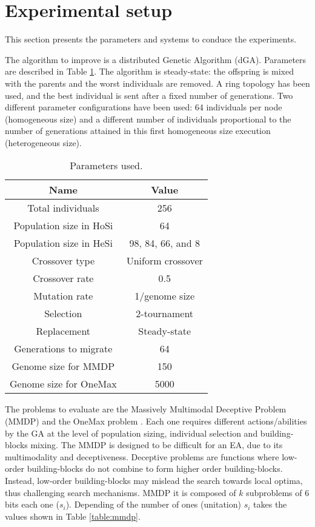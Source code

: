 \documentclass{sig-alternate}
\begin{document}

\section{Experimental setup}
\label{subsec:experiments}
This section presents the parameters and systems to conduce the experiments.

The algorithm to improve is a distributed Genetic Algorithm (dGA). Parameters are described in Table \ref{table:parameters}. The algorithm is steady-state: the offspring is mixed with the parents and the worst individuals are removed. A ring topology has been used, and the best individual is sent after a fixed number of generations.  Two different parameter configurations have been used: 64 individuals per node (homogeneous size) and a different number of individuals proportional to the number of generations attained in this first homogeneous size execution (heterogeneous size).


\begin{table}
\centering
\caption{Parameters used.}
\begin{tabular}{|c|c|} \hline
Name & Value\\ \hline
Total individuals & 256\\ \hline
Population size in HoSi & 64 \\ \hline
Population size in HeSi & 98, 84, 66, and 8\\ \hline
Crossover type & Uniform crossover \\ \hline
Crossover rate & 0.5\\ \hline
Mutation rate & 1/genome size\\ \hline
Selection & 2-tournament \\ \hline
Replacement & Steady-state\\ \hline
Generations to migrate & 64 \\ \hline
Genome size for MMDP & 150 \\ \hline
Genome size for OneMax & 5000 \\ 

\hline\end{tabular}
\label{table:parameters}
\end{table}

The problems to evaluate are the Massively Multimodal Deceptive Problem (MMDP) \cite{goldberg92massive} and the OneMax problem \cite{ONEMAX}. Each one requires different actions/abilities by the GA at the level of population sizing, individual selection and building-blocks mixing. The MMDP
 is designed to be difficult for an EA, due to
its multimodality and deceptiveness. Deceptive problems are functions where low-order building-blocks do not combine to form higher order building-blocks. Instead, low-order building-blocks may mislead the search towards local optima, thus challenging search mechanisms. MMDP it is composed of $k$ subproblems of 6 bits each one ($s_i$). Depending of
the number of ones (unitation) $s_i$ takes the values shown in Table \ref{table:mmdp}.  
\end{document}
